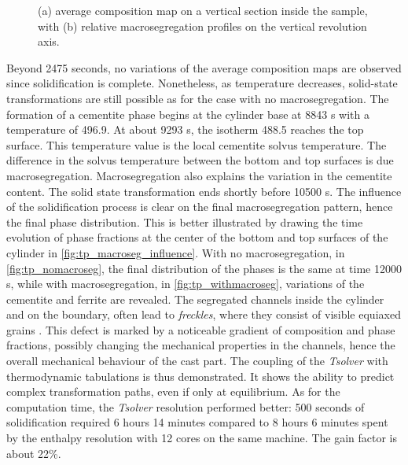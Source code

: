 \begin{figure}[htbp]
\begin{subfigure}[t]{0.55\textwidth}
	\caption{}
    \label{fig:final_segregation_ZZ_FF}
  \end{subfigure}
\caption{(a) average composition map on a vertical section inside the sample, with
 (b) relative macrosegregation profiles on the vertical revolution axis.} 
\label{fig:final_ZZ_FF}
\end{figure}
%
Beyond \num{2475} seconds, no variations of the average composition maps are observed since solidification is complete. 
Nonetheless, as temperature decreases, solid-state transformations are 
still possible as for the case with no macrosegregation. The formation of a cementite phase begins at the 
cylinder base at \num{8843} s with a temperature of \SI{496.9}{\udegC}. At about \num{9293} s, the isotherm \SI{488.5}{\udegC} reaches the 
top surface. This temperature value is the local cementite solvus temperature. The difference in the solvus 
temperature between the bottom and top surfaces is due macrosegregation. Macrosegregation also explains the 
variation in the cementite content. The solid state transformation ends shortly before \num{10500} s. The influence of the solidification process is clear on 
the final macrosegregation pattern, hence the final phase distribution. This is better illustrated by drawing the time evolution of phase fractions at the 
center of the bottom and top surfaces of the cylinder in \cref{fig:tp_macroseg_influence}. With no macrosegregation, in 
\cref{fig:tp_nomacroseg}, the final distribution of the phases is the same at time \num{12000} s, while with macrosegregation, 
in \cref{fig:tp_withmacroseg}, variations of the cementite and ferrite are revealed. 
The segregated channels inside the cylinder and on the boundary, often lead to \emph{freckles}, 
where they consist of visible equiaxed grains \citep{copley_origin_1970}.
This defect is marked by a noticeable gradient of composition and phase fractions, possibly changing the mechanical 
properties in the channels, hence the overall mechanical behaviour of the cast part. The coupling of the \emph{Tsolver} with 
thermodynamic tabulations is thus demonstrated. It shows the ability to predict complex transformation paths, even if 
only at equilibrium. As for the computation time, the \emph{Tsolver} resolution performed better: 500 seconds of solidification 
required 6 hours 14 minutes compared to 8 hours 6 minutes spent by the enthalpy resolution with 12 cores on the same machine. 
The gain factor is about 22\%.
%
